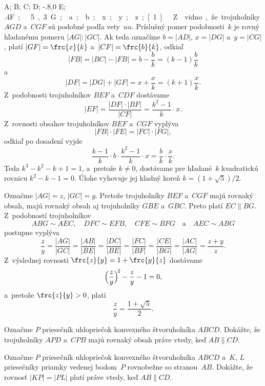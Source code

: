 {%
\fontplace
\tpoint A; \tpoint B; \bpoint C; \bpoint D;
\tpoint\xy-.8,0 E; \lpoint\up.4\unit F; \bpoint\xy.5,.3 G;
\tpoint a; \rBpoint b;
\lBpoint x; \rBpoint y; \rBpoint z;
[1] \hfil\Obr

Z~\obr{} vidno, že trojuholníky $AGD$ a~$CGF$ sú podobné
\inspicture{}
podľa vety~$uu$. Príslušný pomer podobnosti~$k$ je rovný
hľadanému pomeru $|AG|:|GC|$. Ak teda označíme $b=|AD|$,
$x=|DG|$ a~$y=|CG|$, platí $|GF|=\frc{x}{k}$ a~$|CF|=\frc{b}{k}$,
odkiaľ
$$
|FB|=|BC|-|FB|=b-\frac{b}{k}=(k-1)\frac{b}{k}
$$
a~$$
|DF|=|DG|+|GF|=x+\frac{x}{k}=(k+1)\frac{x}{k}.
$$
Z~podobnosti trojuholníkov $BEF$ a~$CDF$ dostávame
$$
|EF|=\frac{|DF|\cdot|BF|}{|CF|}=\frac{k^2-1}{k}\cdot x.
$$
Z~rovnosti obsahov trojuholníkov $BEF$ a~$CGF$ vyplýva
$$
|FB|\cdot|FE|=|FC|\cdot|FG|,
$$
odkiaľ po dosadení vyjde
$$
\frac{k-1}{k}\cdot b\cdot \frac{k^2-1}{k} \cdot x
=\frac {b}{k}\cdot \frac{x}{k}.
$$
Teda $k^3-k^2-k+1=1$, a~pretože $k\ne 0$, dostávame pre
hľadané~$k$ kvadratickú rovnicu $k^2-k-1=0$. Úlohe vyhovuje jej
kladný koreň $k=(1+\sqrt{5})/2$.

\ineriesenie
Označme $|AG|=z$, $|GC|=y$. Pretože trojuholníky $BEF$ a~$CGF$
majú rovnaký obsah, majú rovnaký obsah aj trojuholníky $GBE$ a~$GBC$. Preto
platí $EC\parallel BG$. Z~podobností trojuholníkov
$$
ABG\sim AEC,\quad DFC\sim EFB,\quad CFE\sim BFG\quad\text{a}\quad AEC\sim ABG
$$
postupne vyplýva
$$
\frac{z}{y}=\frac{|AG|}{|GC|}=\frac{|AB|}{|BE|}=\frac{|DC|}{|BE|}=
\frac{|FC|}{|BF|}=
\frac{|CE|}{|BG|}=
\frac{|AC|}{|AG|}=\frac{z+y}{z}.
$$
Z~výslednej rovnosti $\frc{z}{y}=1+\frc{y}{z}$ dostávame
$$
\Bigl(\frac{z}{y}\Bigr)^{\!2}-\frac{z}{y}-1=0,
$$
a~pretože $\frc{z}{y}>0$, platí
$$
\frac{z}{y}=\frac{1+\sqrt{5}}{2}.
$$


Označme $P$ priesečník uhlopriečok konvexného
štvoruholníka $ABCD$. Dokážte, že trojuholníky $APD$ a~$CPB$ majú
rovnaký obsah práve vtedy, keď $AB\parallel CD$.

Označme $P$ priesečník uhlopriečok konvexného štvoruholníka $ABCD$
a~$K$, $L$ priesečníky priamky vedenej bodom~$P$ rovnobežne so
stranou~$AB$. Dokážte, že rovnosť $|KP|=|PL|$ platí práve vtedy, keď
$AB\parallel CD$.
}

